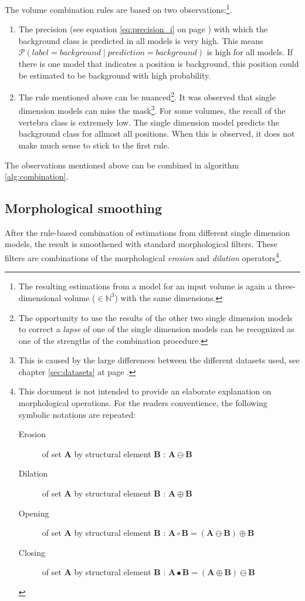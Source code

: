 The volume combination rules are based on two observations:\footnote{
    The resulting estimations from a model for an input volume is again a three-dimensional volume ($\in \mathbb{N}^3$) with the same dimensions.
}.
\begin{enumerate}
    \item The precision (see equation \ref{eq:precision_i} on page \pageref{eq:precision_i}) with which the background class is predicted in all models is very high.
            This means $\mathcal{P} \left( label = background \mid prediction = background \right)$ is high for all models. 
            If there is one model that indicates a position is background, this position could be estimated to be background with high probability.
    \item The rule mentioned above can be nuanced\footnote{The opportunity to use the results of the other two single dimension models to correct a \textit{lapse} of one of the single dimension models can be recognized as one of the strengths of the combination procedure.}.
    It was observed that single dimension models can miss the mask\footnote{This is caused by the large differences between the different datasets used, see chapter \ref{sec:datasets} at page \pageref{sec:datasets}.}. 
    For some volumes, the recall of the vertebra class is extremely low. The single dimension model predicts the background class for allmost all positions.
    When this is observed, it does not make much sense to stick to the first rule.
\end{enumerate}
The observations mentioned above can be combined in algorithm \ref{alg:combination}.

\subsection{Morphological smoothing}
After the rule-based combination of estimations from different single dimension models, the result is smoothened with standard morphological filters.
These filters are combinations of the morphological \textit{erosion} and \textit{dilation} operators\footnote{
    This document is not intended to provide an elaborate explanation on morphological operations.
    For the readers conventience, the following symbolic notations are repeated:
    \begin{description}
        \item[Erosion] of set $\mathbf{A}$ by structural element $\mathbf{B}$ : $\mathbf{A} \ominus \mathbf{B}$ 
        \item[Dilation] of set $\mathbf{A}$ by structural element $\mathbf{B}$ : $\mathbf{A} \oplus \mathbf{B}$ 
        \item[Opening] of set $\mathbf{A}$ by structural element $\mathbf{B}$ : $\mathbf{A} \circ \mathbf{B} = (\mathbf{A} \ominus \mathbf{B}) \oplus \mathbf{B}$
        \item[Closing] of set $\mathbf{A}$ by structural element $\mathbf{B}$ : $\mathbf{A} \bullet \mathbf{B} = (\mathbf{A} \oplus \mathbf{B}) \ominus \mathbf{B}$
    \end{description}
}.

